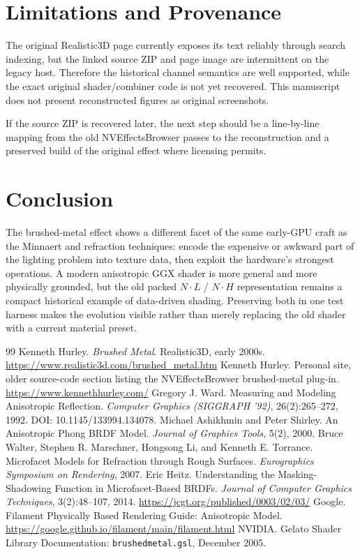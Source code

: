 \documentclass[10pt]{article}
\begin{document}
\section{Limitations and Provenance}
The original Realistic3D page currently exposes its text reliably through search indexing, but the linked source ZIP and page image are intermittent on the legacy host. Therefore the historical channel semantics are well supported, while the exact original shader/combiner code is not yet recovered. This manuscript does not present reconstructed figures as original screenshots.

If the source ZIP is recovered later, the next step should be a line-by-line mapping from the old NVEffectsBrowser passes to the reconstruction and a preserved build of the original effect where licensing permits.

\section{Conclusion}
The brushed-metal effect shows a different facet of the same early-GPU craft as the Minnaert and refraction techniques: encode the expensive or awkward part of the lighting problem into texture data, then exploit the hardware's strongest operations. A modern anisotropic GGX shader is more general and more physically grounded, but the old packed $N\cdot L$ / $N\cdot H$ representation remains a compact historical example of data-driven shading. Preserving both in one test harness makes the evolution visible rather than merely replacing the old shader with a current material preset.

\begin{thebibliography}{99}
 Kenneth Hurley. \emph{Brushed Metal}. Realistic3D, early 2000s. \url{https://www.realistic3d.com/brushed_metal.htm}
 Kenneth Hurley. Personal site, older source-code section listing the NVEffectsBrowser brushed-metal plug-in. \url{https://www.kennethhurley.com/}
 Gregory J. Ward. Measuring and Modeling Anisotropic Reflection. \emph{Computer Graphics (SIGGRAPH '92)}, 26(2):265--272, 1992. DOI: 10.1145/133994.134078.
 Michael Ashikhmin and Peter Shirley. An Anisotropic Phong BRDF Model. \emph{Journal of Graphics Tools}, 5(2), 2000.
 Bruce Walter, Stephen R. Marschner, Hongsong Li, and Kenneth E. Torrance. Microfacet Models for Refraction through Rough Surfaces. \emph{Eurographics Symposium on Rendering}, 2007.
 Eric Heitz. Understanding the Masking-Shadowing Function in Microfacet-Based BRDFs. \emph{Journal of Computer Graphics Techniques}, 3(2):48--107, 2014. \url{https://jcgt.org/published/0003/02/03/}
 Google. Filament Physically Based Rendering Guide: Anisotropic Model. \url{https://google.github.io/filament/main/filament.html}
 NVIDIA. Gelato Shader Library Documentation: \texttt{brushedmetal.gsl}, December 2005.
\end{thebibliography}
\end{document}
